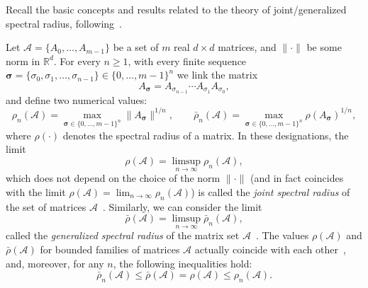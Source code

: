 \documentclass[a4paper,10pt,reqno]{amsart}
\let\cite\citep
\newcommand{\setA}{\mathscr{A}}
\begin{document}
Recall the basic concepts and results related to the theory of
joint/generalized spectral radius, following~\cite{Koz:CDC05:e,
Koz:INFOPROC05:e, Koz:INFOPROC06:e}.

Let $\setA=\{A_{0},\ldots,A_{m-1}\}$ be a set of $m$ real $d\times d$
matrices, and $\|\cdot\|$ be some norm in ${\mathbb{R}}^{d}$. For every
$n\ge1$, with every finite sequence $\boldsymbol{\sigma}=
\{\sigma_{0},\sigma_{1},\ldots,\sigma_{n-1}\}\in{\{0,\ldots,m-1\}}^{n}$ we
link the matrix
\[
A_{\boldsymbol{\sigma}}=A_{\sigma_{n-1}}\cdots A_{\sigma_{1}}A_{\sigma_{0}},
\]
and define two numerical values:
\[
\rho_{n}({\setA})=\max_{\boldsymbol{\sigma}\in{\{0,\ldots,m-1\}}^{n}}
\|A_{\boldsymbol{\sigma}}\|^{1/n},\qquad
\bar{\rho}_{n}({\setA})=\max_{\boldsymbol{\sigma}\in{\{0,\ldots,m-1\}}^{n}}
{\rho(A_{\boldsymbol{\sigma}})}^{1/n},
\]
where $\rho(\cdot)$ denotes the spectral radius of a matrix. In these
designations, the limit
\[
\rho({\setA})= \limsup_{n\to\infty}\rho_{n}({\setA}),
\]
which does not depend on the choice of the norm $\|\cdot\|$ (and in fact
coincides with the limit $\rho({\setA})=\lim_{n\to\infty}\rho_{n}({\setA})$)
is called the \emph{joint spectral radius} of the set of matrices
$\setA$~\cite{RotaStr:IM60}. Similarly, we can consider the limit
\[
\bar{\rho}({\setA})= \limsup_{n\to\infty}\bar{\rho}_{n}({\setA}),
\]
called the \emph{generalized spectral radius} of the matrix set
$\setA$~\cite{DaubLag:LAA92}. The values $\rho({\setA})$ and
$\bar{\rho}({\setA})$ for bounded families of matrices $\setA$ actually
coincide with each other~\cite{BerWang:LAA92}, and, moreover, for any $n$,
the following inequalities hold:
\begin{equation}\label{Eq-sprad}
\bar{\rho}_{n}({\setA})\le \bar{\rho}({\setA})=\rho({\setA})\le
\rho_{n}({\setA}).
\end{equation}
\end{document}
